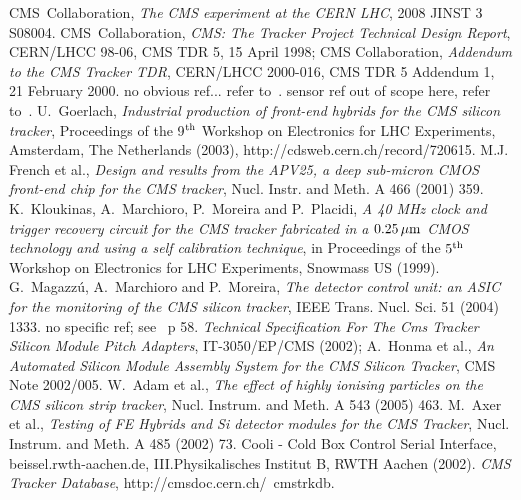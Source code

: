\begin{thebibliography}{9}
 CMS~Collaboration, {\em The CMS experiment at
    the CERN LHC}, 2008 JINST 3 S08004.
 CMS~Collaboration, {\em CMS: The Tracker Project
    Technical Design Report}, CERN/LHCC 98-06, CMS TDR 5, 15 April
  1998; CMS Collaboration, {\em Addendum to the CMS Tracker TDR}, CERN/LHCC
  2000-016, CMS TDR 5 Addendum 1, 21 February 2000.
 no obvious ref... refer to~\cite{bigcmspaper}.
 sensor ref out of scope here, refer to~\cite{bigcmspaper}. 
 U.~Goerlach, {\em Industrial production of front-end
    hybrids for the CMS silicon tracker}, Proceedings of the 9$^{\rm
    th}$ Workshop on Electronics for LHC Experiments, Amsterdam, The
  Netherlands (2003), http://cdsweb.cern.ch/record/720615.
 M.J. French et al., {\em Design and results from the
    APV25, a deep sub-micron CMOS front-end chip for the CMS tracker},
  Nucl. Instr. and Meth. A 466 (2001) 359.
 K.~Kloukinas, A.~Marchioro, P.~Moreira and P.~Placidi,
  {\em A 40 MHz clock and trigger recovery circuit for the CMS tracker
    fabricated in a $0.25{\, \mu \rm m}$ CMOS technology and using a self
    calibration technique}, in Proceedings of the $5^{\rm th}$
  Workshop on Electronics for LHC Experiments, Snowmass US (1999).
 G.~Magazz\'u, A.~Marchioro and P.~Moreira, {\em The
    detector control unit: an ASIC for the monitoring of the CMS
    silicon tracker}, IEEE Trans. Nucl. Sci. 51 (2004) 1333.
 no specific ref; see~\cite{bigcmspaper} p 58. 
 {\em Technical Specification For The Cms Tracker Silicon
  Module Pitch Adapters}, IT-3050/EP/CMS (2002);
 A.~Honma et al., {\em An Automated Silicon Module
    Assembly System for the CMS Silicon Tracker}, CMS Note 2002/005.
 W.~Adam et al., {\em The effect of highly ionising
    particles on the CMS silicon strip tracker}, Nucl. Instrum. and
  Meth. A 543 (2005) 463.
 M.~Axer et al., {\em Testing of FE Hybrids and Si
    detector modules for the CMS Tracker}, Nucl. Instrum. and Meth. A
  485 (2002) 73.
 Cooli - Cold Box Control Serial Interface,
  beissel\@physik.rwth-aachen.de, III.Physikalisches Institut B, RWTH
  Aachen (2002).
  {\em CMS Tracker Database}, http://cmsdoc.cern.ch/~cmstrkdb.
\end{thebibliography}
